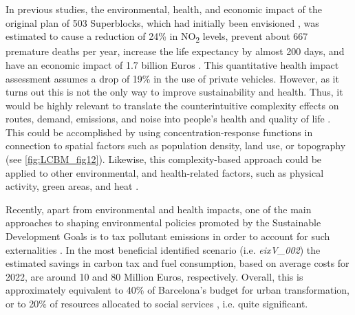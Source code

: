 In previous studies, the environmental, health, and economic impact of the original plan of 503 Superblocks, which had initially been envisioned \citep{Rueda2018}, was estimated to cause a reduction of 24\% in NO\textsubscript{2} levels, prevent about 667 premature deaths per year, increase the life expectancy by almost 200 days, and have an economic impact of 1.7 billion Euros \citep{Mueller2020}. This quantitative health impact assessment assumes a drop of 19\% in the use of private vehicles. However, as it turns out this is not the only way to improve sustainability and health. Thus, it would be highly relevant to translate the counterintuitive complexity effects on routes, demand, emissions, and noise  into people’s health and quality of life \citep{Nagurney2000,Wang2017}. This could be accomplished by using concentration-response functions \citep{Atkinson2018} in connection to spatial factors such as population density, land use, or topography (see \cref{fig:LCBM_fig12}). Likewise, this complexity-based approach could be applied to other environmental, and health-related factors, such as physical activity, green areas, and heat \citep{Mueller2020,Woodcock2011,Gascon2016,Guo2014}.

Recently, apart from environmental and health impacts, one of the main approaches to shaping environmental policies promoted by the Sustainable Development Goals is to tax pollutant emissions in order to account for such externalities \citep{Ghazouani2020}. In the most beneficial identified scenario (i.e. \emph{eixV\_002}) the estimated savings in carbon tax \citep{Sendeco2} and fuel consumption, based on average costs for 2022, are around 10 and 80 Million Euros, respectively. Overall, this is approximately equivalent to 40\% of Barcelona’s budget for urban transformation, or to 20\% of resources allocated to social services \citep{AjuntamentdeBarcelona2021b}, i.e. quite significant.

